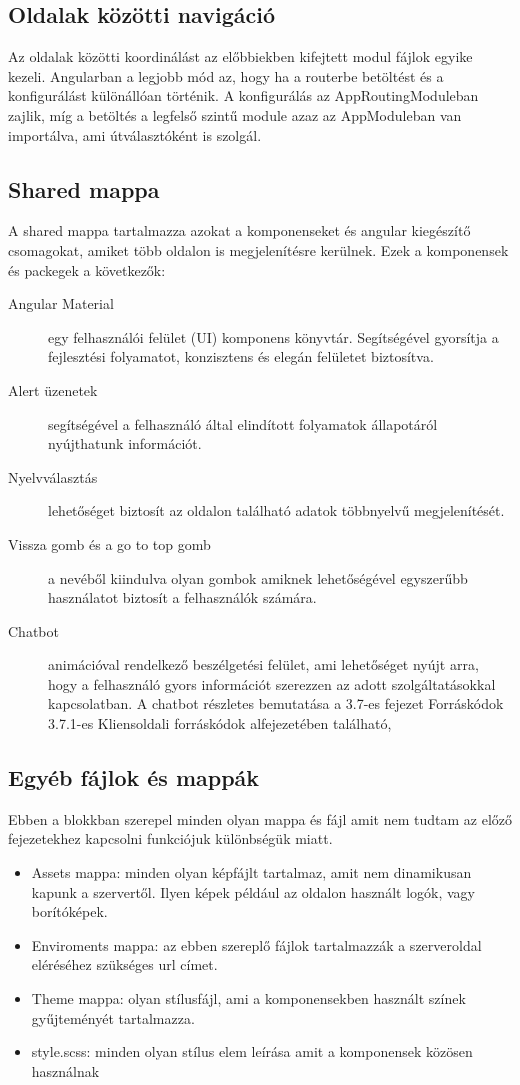 \subsection{Oldalak közötti navigáció}
Az oldalak közötti koordinálást az előbbiekben kifejtett modul fájlok egyike kezeli. Angularban a legjobb mód az, hogy ha a routerbe betöltést és a konfigurálást különállóan történik. A konfigurálás az AppRoutingModuleban zajlik, míg a betöltés a legfelső szintű module azaz az AppModuleban van importálva, ami útválasztóként is szolgál.

\subsection{Shared mappa}
A shared mappa tartalmazza azokat a komponenseket és angular kiegészítő csomagokat, amiket több oldalon is megjelenítésre kerülnek. Ezek a komponensek és packegek a következők:

\begin{description}
	\item[Angular Material] egy felhasználói felület (UI) komponens könyvtár. Segítségével gyorsítja a fejlesztési folyamatot, konzisztens és elegán felületet biztosítva.
	\item[Alert üzenetek] segítségével a felhasználó által elindított folyamatok állapotáról nyújthatunk információt.
	\item[Nyelvválasztás] lehetőséget biztosít az oldalon található adatok többnyelvű megjelenítését.
	\item[Vissza gomb és a go to top gomb] a nevéből kiindulva olyan gombok amiknek lehetőségével egyszerűbb használatot biztosít a felhasználók számára.
	\item[Chatbot] animációval rendelkező beszélgetési felület, ami lehetőséget nyújt arra, hogy a felhasználó gyors információt szerezzen az adott szolgáltatásokkal kapcsolatban. A chatbot részletes bemutatása a 3.7-es fejezet Forráskódok 3.7.1-es Kliensoldali forráskódok alfejezetében található,
\end{description}

\subsection{Egyéb fájlok és mappák}
Ebben a blokkban szerepel minden olyan mappa és fájl amit nem tudtam az előző fejezetekhez kapcsolni funkciójuk különbségük miatt.

\begin{itemize}
	\item Assets mappa: minden olyan képfájlt tartalmaz, amit nem dinamikusan kapunk a szervertől. Ilyen képek például az oldalon használt logók, vagy borítóképek.
	\item Enviroments mappa: az ebben szereplő fájlok tartalmazzák a szerveroldal eléréséhez szükséges url címet.
	\item Theme mappa: olyan stílusfájl, ami a komponensekben használt színek gyűjteményét tartalmazza.
	\item style.scss: minden olyan stílus elem leírása amit a komponensek közösen használnak
\end{itemize}

